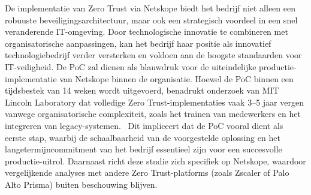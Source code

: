 De implementatie van Zero Trust via Netskope biedt het bedrijf niet alleen een robuuste beveiligingsarchitectuur, maar ook een strategisch voordeel in een snel veranderende IT-omgeving. 
Door technologische innovatie te combineren met organisatorische aanpassingen, kan het bedrijf haar positie als innovatief technologiebedrijf verder versterken en voldoen aan de hoogste standaarden voor IT-veiligheid. 
De PoC zal dienen als blauwdruk voor de uiteindelijke productie-implementatie van Netskope binnen de organisatie.
Hoewel de PoC binnen een tijdsbestek van 14 weken wordt uitgevoerd, benadrukt onderzoek van MIT Lincoln Laboratory dat volledige Zero Trust-implementaties vaak 3–5 jaar vergen vanwege organisatorische complexiteit, zoals het trainen van medewerkers en het integreren van legacy-systemen.~\autocite{MIT2022}
Dit impliceert dat de PoC vooral dient als eerste stap, waarbij de schaalbaarheid van de voorgestelde oplossing en het langetermijncommitment van het bedrijf essentieel zijn voor een succesvolle productie-uitrol. 
Daarnaast richt deze studie zich specifiek op Netskope, waardoor vergelijkende analyses met andere Zero Trust-platforms (zoals Zscaler of Palo Alto Prisma) buiten beschouwing blijven. 